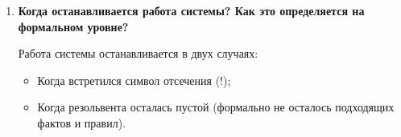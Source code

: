 \begin{enumerate}
    \item \textbf{Когда останавливается работа системы? Как это определяется на формальном уровне?}

        Работа системы останавливается в двух случаях:

        \begin{itemize}
            \item Когда встретился символ отсечения (!);
            \item Когда резольвента осталась пустой (формально не осталось подходящих фактов и правил).
        \end{itemize}
\end{enumerate}
